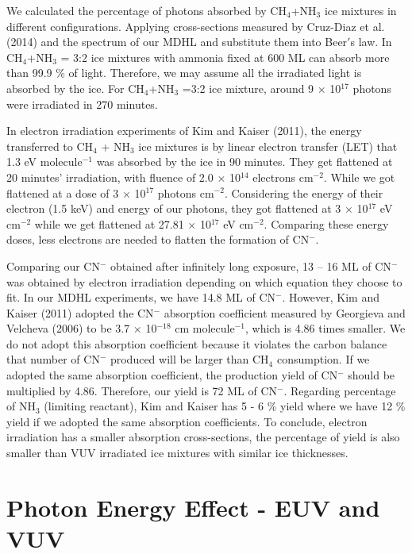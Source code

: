 We calculated the percentage of photons absorbed by CH$_4$+NH$_3$ ice mixtures in different configurations. Applying cross-sections measured by Cruz-Diaz et al. (2014) and the spectrum of our MDHL and substitute them into Beer$'$s law. In CH$_4$+NH$_3$ = 3:2 ice mixtures with ammonia fixed at 600 ML can absorb more than 99.9 \% of light. Therefore, we may assume all the irradiated light is absorbed by the ice. For CH$_4$+NH$_3$ =3:2 ice mixture, around 9 $\times$ 10$^{17}$ photons were irradiated in 270 minutes.

In electron irradiation experiments of Kim and Kaiser (2011)\cite{kim}, the energy transferred to CH$_4$ + NH$_3$ ice mixtures is by linear electron transfer (LET) that 1.3 eV molecule$^{-1}$ was absorbed by the ice in 90 minutes. They get flattened at 20 minutes’ irradiation, with fluence of 2.0 $\times$ 10$^{14}$ electrons cm$^{-2}$. While we got flattened at a dose of 3 $\times$ 10$^{17}$ photons cm$^{-2}$. Considering the energy of their electron (1.5 keV) and energy of our photons, they got flattened at 3 $\times$ 10$^{17}$ eV cm$^{-2}$ while we get flattened at 27.81 $\times$ 10$^{17}$ eV cm$^{-2}$. Comparing these energy doses, less electrons are needed to flatten the formation of CN$^-$.

Comparing our CN$^-$ obtained after infinitely long exposure, 13 – 16 ML of CN$^-$ was obtained by electron irradiation depending on which equation they choose to fit. In our MDHL experiments, we have 14.8 ML of CN$^-$. However, Kim and Kaiser (2011) adopted the CN$^-$ absorption coefficient measured by Georgieva and Velcheva (2006) to be 3.7 $\times$ 10$^{-18}$ cm molecule$^{-1}$, which is 4.86 times smaller. We do not adopt this absorption coefficient because it violates the carbon balance that number of CN$^-$ produced will be larger than CH$_4$ consumption. If we adopted the same absorption coefficient, the production yield of CN$^-$ should be multiplied by 4.86. Therefore, our yield is 72 ML of CN$^-$. Regarding percentage of NH$_3$ (limiting reactant), Kim and Kaiser has 5 - 6 \% yield where we have 12 \% yield if we adopted the same absorption coefficients. To conclude, electron irradiation has a smaller absorption cross-sections, the percentage of yield is also smaller than VUV irradiated ice mixtures with similar ice thicknesses.




\section{Photon Energy Effect - EUV and VUV} %

